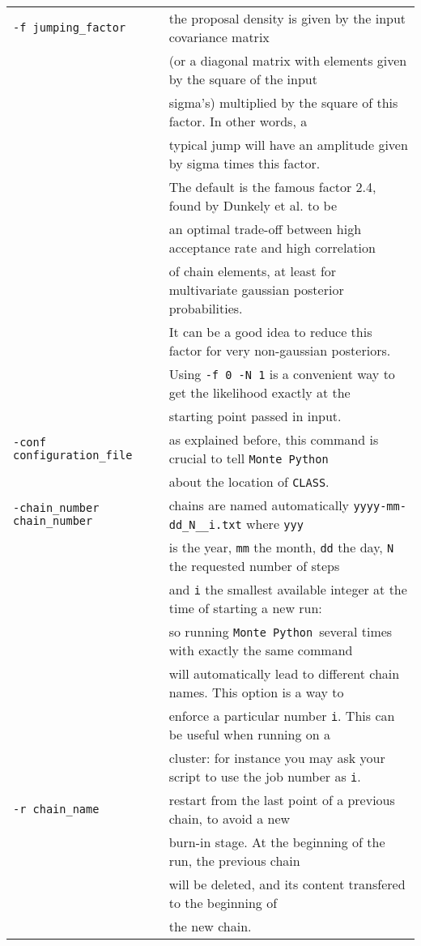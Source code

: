 \documentclass[10pt]{article}
\newcommand{\CLASS}{\texttt{CLASS}}
\newcommand{\MP}{\texttt{Monte Python}}
\begin{document}
\begin{itemize}
\begin{tabular}{ll}
\verb?-f jumping_factor? & the proposal density is given by the input covariance matrix \\&(or a diagonal matrix with elements given by the square of the input \\&sigma's) multiplied by the square of this factor. In other words, a \\& typical jump will have an amplitude given by sigma times this factor. \\&The default is the famous factor 2.4, found by Dunkely et al. to be\\& an optimal trade-off between high acceptance rate and high correlation\\& of chain elements, at least for multivariate gaussian posterior probabilities.\\& It can be a good idea to reduce this factor for very non-gaussian posteriors. \\&Using \verb?-f 0 -N 1? is a convenient way to get the likelihood exactly at the \\& starting point passed in input. \\
\verb?-conf configuration_file? & as explained before, this command is crucial to tell \MP\\&about the location of \CLASS.\\
\verb?-chain_number chain_number? & chains are named automatically \verb?yyyy-mm-dd_N__i.txt? where {\tt yyy}\\& is the year, {\tt mm} the month, {\tt dd} the day, {\tt N} the requested number of steps\\& and {\tt i} the smallest available integer at the time of starting a new run:\\& so running \MP~several times with exactly the same command\\& will automatically lead to different chain names. This option is a way to \\&enforce a particular number {\tt i}. This can be useful when running on a\\& cluster: for instance you may ask your script to use the job number as {\tt i}. \\
\verb?-r chain_name? & restart from the last point of a previous chain, to avoid a new\\& burn-in stage. At the beginning of the run, the previous chain\\& will be deleted, and its content transfered to the beginning of\\& the new chain.
\end{tabular}

\end{itemize}
\end{document}
